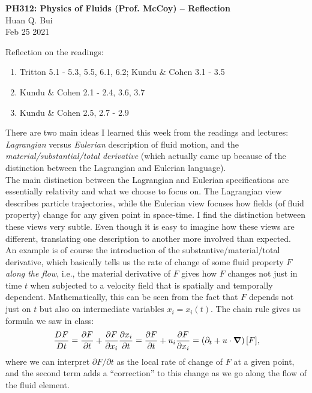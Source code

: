 \documentclass[11pt]{article}
\newcommand{\f}[2]{\frac{#1}{#2}}
\begin{document}
\begin{center}
{\large \bf PH312: Physics of Fluids (Prof. McCoy) -- Reflection}\\
{ Huan Q. Bui}\\
Feb 25 2021
\end{center}

\begin{framed}
	\noindent Reflection on the readings:
	\begin{enumerate}
		\item Tritton 5.1 - 5.3, 5.5, 6.1, 6.2; Kundu \& Cohen 3.1 - 3.5
		\item Kundu \& Cohen 2.1 - 2.4, 3.6, 3.7
		\item Kundu \& Cohen 2.5, 2.7 - 2.9
	\end{enumerate}
\end{framed}


\noindent There are two main ideas I learned this week from the readings and lectures: \textit{Lagrangian} versus \textit{Eulerian} description of fluid motion, and the \textit{material/substantial/total derivative} (which actually came up because of the distinction between the Lagrangian and Eulerian language). \\

The main distinction between the Lagrangian and Eulerian specifications are essentially relativity and what we choose to focus on. The Lagrangian view describes particle trajectories, while the Eulerian view focuses how fields (of fluid property) change for any given point in space-time. I find the distinction between these views very subtle. Even though it is easy to imagine how these views are different, translating one description to another more involved than expected. \\

An example is of course the introduction of the substantive/material/total derivative, which basically tells us the rate of change of some fluid property $F$ \textit{along the flow}, i.e., the material derivative of $F$ gives how $F$ changes not just in time $t$ when subjected to a velocity field that is spatially and temporally dependent. Mathematically, this can be seen from the fact that $F$ depends not just on $t$ but also on intermediate variables $x_i = x_i(t)$. The chain rule gives us formula we saw in class:
\begin{equation*}
\frac{DF}{Dt} = \frac{\partial F}{\partial t} + \frac{\partial F}{\partial x_i} \f{\partial x_i}{\partial t} = \frac{\partial F}{\partial t} + u_i\frac{\partial F}{\partial x_i}  = \left( \partial_t + u \cdot \grad \right) [F],
\end{equation*}
where we can interpret $\partial F/\partial t$ as the local rate of change of $F$ at a given point, and the second term adds a ``correction'' to this change as we go along the flow of the fluid element. \\
\end{document}
